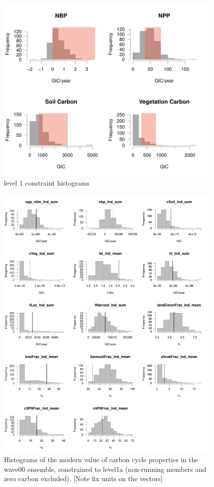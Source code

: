 \documentclass[gmd, manuscript]{copernicus}
\begin{document}
\begin{figure}[t]
\includegraphics[width=12cm]{./graphics/level_2_constraints_hists.pdf}
\caption{level 1 constraint histograms}
\label{fig:level_2_constraints_hists}
\end{figure}


%
\begin{figure}[t]
\includegraphics[width=12cm]{./graphics/wave00-level1a-modern-value-hists.pdf}
\caption{Histograms of the modern value of carbon cycle properties in the wave00 ensemble, constrained to level1a (non-running members and zero carbon excluded). [Note fix units on the vectors]}
\label{fig:wave00-level1a-modern-value-hists}
\end{figure}
\end{document}
